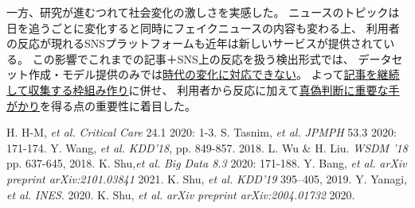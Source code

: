 一方、研究が進むつれて社会変化の激しさを実感した。
ニュースのトピックは日を追うごとに変化すると同時にフェイクニュースの内容も変わる上、
利用者の反応が現れるSNSプラットフォームも近年は新しいサービスが提供されている。
この影響でこれまでの記事＋SNS上の反応を扱う検出形式では、
データセット作成・モデル提供のみでは\underline{時代の変化に対応できない}。
よって\underline{記事を継続して収集する枠組み作り}に併せ、
利用者から反応に加えて\underline{真偽判断に重要な手がかり}を得る点の重要性に着目した。


{\footnotesize 
\begin{twobibliography}{99}
    \setlength{\parskip}{0cm}
    \setlength{\itemsep}{0cm}
     H. H-M, \textit{et al.} \textit{Critical Care} 24.1 2020: 1-3.
     S. Tasnim, \textit{et al.} \textit{JPMPH} 53.3 2020: 171-174.
     Y. Wang, \textit{et al.} \textit{KDD'18}, pp. 849-857. 2018.
     L. Wu \& H. Liu. \textit{WSDM '18}  pp. 637-645, 2018.
     K. Shu,\textit{et al.} \textit{Big Data 8.3} 2020: 171-188.
     Y. Bang, \textit{et al.} \textit{arXiv preprint arXiv:2101.03841} 2021.
     K. Shu, \textit{et al.} \textit{KDD'19} 395–405, 2019.
     Y. Yanagi, \textit{et al.} \textit{INES}. 2020.
     K. Shu, \textit{et al.}  \textit{arXiv preprint arXiv:2004.01732} 2020.
\end{twobibliography}
}


